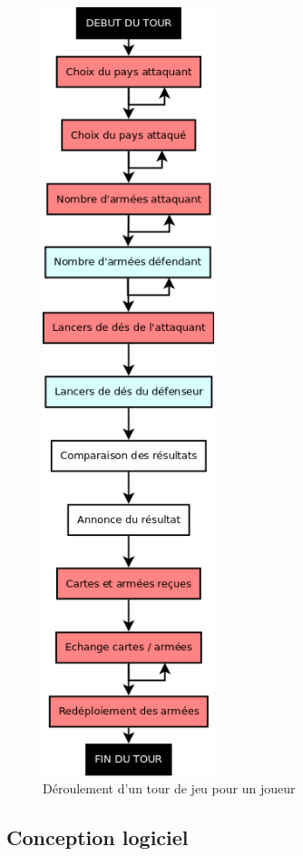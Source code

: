 \begin{figure}[!htbp]
    \centering
    \includegraphics[width=5cm]{Images/tour_jeu.png}
    \caption{Déroulement d'un tour de jeu pour un joueur}
    \label{fig:tour de jeu}
\end{figure}


\newpage
\subsection{Conception logiciel}

